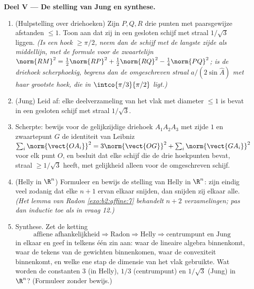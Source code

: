 \begin{problem}
\medskip
\noindent\textbf{Deel V --- De stelling van Jung en synthese.}
\begin{enumerate}[resume]
  \item (Hulpstelling over driehoeken) Zijn $P, Q, R$ drie punten
        met paarsgewijze afstanden $\leq 1$. Toon aan dat zij in
        een gesloten schijf met straal $1/\sqrt3$ liggen.
        \emph{(Is een hoek $\geq \pi/2$, neem dan de schijf met de
        langste zijde als middellijn, met de formule voor de
        zwaartelijn $\norm{RM}^2 = \tfrac12\norm{RP}^2 +
        \tfrac12\norm{RQ}^2 - \tfrac14\norm{PQ}^2$; is de driehoek
        scherphoekig, begrens dan de omgeschreven straal $a/(2\sin
        \widehat A)$ met haar grootste hoek, die in
        $\intco{\pi/3}{\pi/2}$ ligt.)}
  \item (Jung) Leid af: elke  deelverzameling van het vlak
        met diameter $\leq 1$ is bevat in een gesloten schijf met
        straal $1/\sqrt3$.
  \item Scherpte: bewijs voor de gelijkzijdige driehoek
        $A_1A_2A_3$ met zijde $1$ en zwaartepunt $G$ de identiteit
        van Leibniz $\sum_i \norm{\vect{OA_i}}^2 =
        3\norm{\vect{OG}}^2 + \sum_i \norm{\vect{GA_i}}^2$ voor
        elk punt $O$, en besluit dat elke schijf die de drie
        hoekpunten bevat, straal $\geq 1/\sqrt3$ heeft, met
        gelijkheid alleen voor de omgeschreven schijf.
  \item (Helly in $\R^n$) Formuleer en bewijs de stelling van
        Helly in $\R^n$: zijn eindig veel 
        zodanig dat elke $n + 1$ ervan elkaar snijden, dan snijden
        zij elkaar alle. \emph{(Het lemma van Radon
        \cref{exo:b2:affine:7} behandelt $n + 2$ verzamelingen;
        pas dan inductie toe als in vraag 12.)}
  \item Synthese. Zet de ketting
        \[
        \text{affiene afhankelijkheid} \Rightarrow \text{Radon}
        \Rightarrow \text{Helly} \Rightarrow
        \text{centrumpunt en Jung}
        \]
        in elkaar en geef in telkens één zin aan: waar de lineaire
        algebra binnenkomt, waar de tekens van de gewichten
        binnenkomen, waar de convexiteit binnenkomt, en welke ene
        stap de dimensie van het vlak gebruikte. Wat worden de
        constanten $3$ (in Helly), $1/3$ (centrumpunt) en
        $1/\sqrt3$ (Jung) in $\R^n$? (Formuleer zonder bewijs.)
\end{enumerate}
\end{problem}
